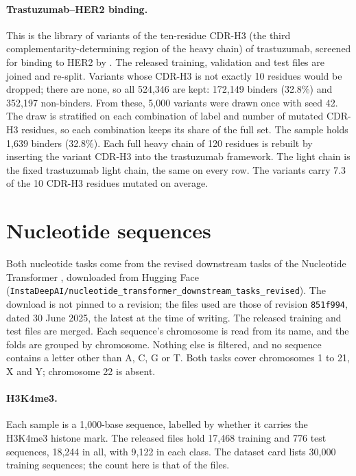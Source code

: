 \paragraph{Trastuzumab--HER2 binding.} This is the library of variants of the ten-residue CDR-H3 (the third complementarity-determining region of the heavy chain) of trastuzumab, screened for binding to HER2 by \citet{Chinery2024}. The released training, validation and test files are joined and re-split. Variants whose CDR-H3 is not exactly 10 residues would be dropped; there are none, so all 524,346 are kept: 172,149 binders (32.8\%) and 352,197 non-binders. From these, 5,000 variants were drawn once with seed 42. The draw is stratified on each combination of label and number of mutated CDR-H3 residues, so each combination keeps its share of the full set. The sample holds 1,639 binders (32.8\%). Each full heavy chain of 120 residues is rebuilt by inserting the variant CDR-H3 into the trastuzumab framework. The light chain is the fixed trastuzumab light chain, the same on every row. The variants carry 7.3 of the 10 CDR-H3 residues mutated on average.

\section{Nucleotide sequences}\label{app:datasets:nucleotides}

Both nucleotide tasks come from the revised downstream tasks of the Nucleotide Transformer \citep{DallaTorre2025}, downloaded from Hugging Face (\texttt{InstaDeepAI/nucleotide\_transformer\_downstream\_tasks\_revised}). The download is not pinned to a revision; the files used are those of revision \texttt{851f994}, dated 30 June 2025, the latest at the time of writing. The released training and test files are merged. Each sequence's chromosome is read from its name, and the folds are grouped by chromosome. Nothing else is filtered, and no sequence contains a letter other than A, C, G or T. Both tasks cover chromosomes 1 to 21, X and Y; chromosome 22 is absent.

\paragraph{H3K4me3.} Each sample is a 1,000-base sequence, labelled by whether it carries the H3K4me3 histone mark. The released files hold 17,468 training and 776 test sequences, 18,244 in all, with 9,122 in each class. The dataset card lists 30,000 training sequences; the count here is that of the files.


